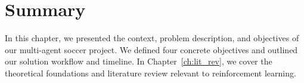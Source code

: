 \section{Summary}
\label{sec:intro_summary}

In this chapter, we presented the context, problem description, and objectives of our multi-agent soccer project. We defined four concrete objectives and outlined our solution workflow and timeline. In Chapter~\ref{ch:lit_rev}, we cover the theoretical foundations and literature review relevant to reinforcement learning.